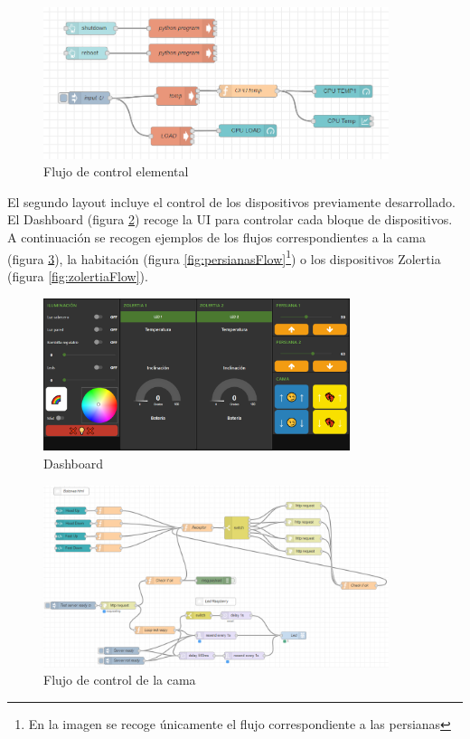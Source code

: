 \begin{figure}[tb]
\centering
\includegraphics[width=0.9\textwidth]{figuras/infoRaspyFlow.png}
\caption{Flujo de control elemental}
\label{fig:infoRaspyFlow}
\end{figure}

El segundo layout incluye el control de los dispositivos previamente desarrollado. El Dashboard (figura \ref{fig:Dashboard}) recoge la UI para controlar cada bloque de dispositivos. A continuación se recogen ejemplos de los flujos correspondientes a la cama (figura \ref{fig:camaFlow}), la habitación (figura \ref{fig:persianasFlow}\footnote{En la imagen se recoge únicamente el flujo correspondiente a las persianas}) o los dispositivos Zolertia (figura \ref{fig:zolertiaFlow}).

\begin{figure}[tb]
\centering
\includegraphics[width=0.8\textwidth]{figuras/Dashboard.png}
\caption{Dashboard}
\label{fig:Dashboard}
\end{figure}

\begin{figure}[tb]
\centering
\includegraphics[width=0.9\textwidth]{figuras/camaFlow.png}
\caption{Flujo de control de la cama}
\label{fig:camaFlow}
\end{figure}

